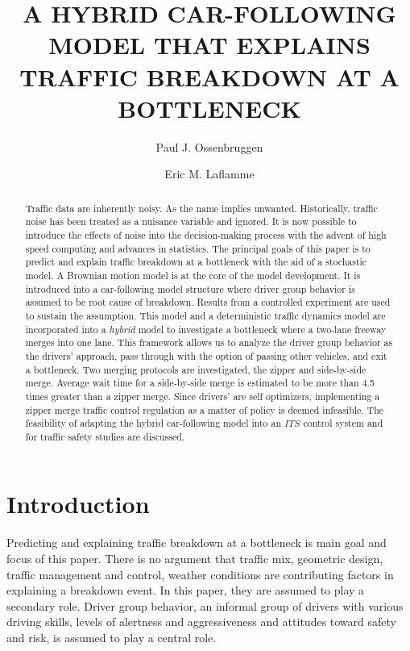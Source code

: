 \documentclass[Proceedings]{ascelike}
\begin{document}
%
\title{A HYBRID CAR-FOLLOWING MODEL THAT EXPLAINS TRAFFIC BREAKDOWN AT A BOTTLENECK}
\author[1]{Paul J. Ossenbruggen} 
\author[2]{Eric M. Laflamme}
\maketitle
\begin{abstract} Traffic data are inherently noisy. As the name implies unwanted. Historically, traffic noise has been  treated as a nuisance variable and ignored. It is now possible to introduce the effects of noise into the decision-making process with the advent of high speed computing and advances in statistics. The principal goals of this paper is to predict and explain traffic breakdown at a bottleneck with the aid of a stochastic model. A Brownian motion model is at the core of the model development. It is introduced into a car-following model structure where driver group behavior is assumed to be root cause of breakdown. Results from a controlled experiment are used to sustain the assumption. This model and a deterministic traffic dynamics model are incorporated into a \emph{hybrid} model to investigate a bottleneck where a two-lane freeway merges into one lane. This framework allows us to analyze the driver group behavior as the drivers' approach, pass through with the option of passing other vehicles, and exit a bottleneck. Two merging protocols are investigated, the zipper and side-by-side merge. Average wait time for a side-by-side merge is estimated to be more than 4.5 times greater  than  a zipper merge. Since drivers' are self optimizers, implementing a zipper merge traffic control regulation as a matter of policy is deemed infeasible. The feasibility of adapting the hybrid car-following model into an $ITS$ control system and for traffic safety studies are discussed.
\end{abstract}
%
     
\section{Introduction}
Predicting and explaining traffic breakdown at a bottleneck is main goal and focus of this paper. There is no argument that traffic mix, geometric design, traffic management and control, weather conditions are contributing factors in explaining a breakdown event. In this paper, they are assumed to play a secondary role. Driver group behavior,  an informal group of drivers with various driving skills, levels of alertness and aggressiveness and attitudes toward safety and risk, is assumed to play a central role. 
\end{document}
